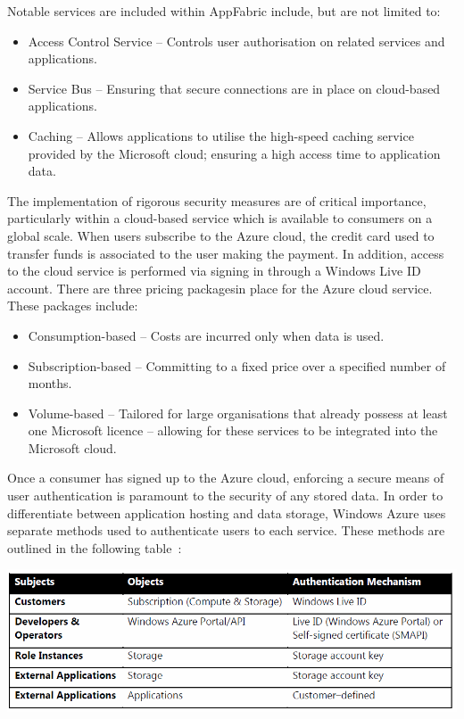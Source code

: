Notable services are included within AppFabric include, but are not limited to\ftAtwo:\ftAtwoText
\begin{itemize}
\item Access Control Service -- Controls user authorisation on related services and applications.
\item Service Bus -- Ensuring that secure connections are in place on cloud-based applications.
\item Caching -- Allows applications to utilise the high-speed caching service provided by the Microsoft cloud; ensuring a high access time to application data.
\end{itemize}

The implementation of rigorous security measures are of critical importance, particularly within a cloud-based service which is available to consumers on a global scale. When users subscribe to the Azure cloud, the credit card used to transfer funds is associated to the user making the payment. In addition, access to the cloud service is performed via signing in through a Windows Live ID account. 
There are three pricing packages\ftAthree in place for the Azure cloud service. These packages include:\ftAthreeText
\begin{itemize}
\item Consumption-based -- Costs are incurred only when data is used.
\item Subscription-based -- Committing to a fixed price over a specified number of months.
\item Volume-based -- Tailored for large organisations that already possess at least one Microsoft licence -- allowing for these services to be integrated into the Microsoft cloud. 
\end{itemize}

Once a consumer has signed up to the Azure cloud, enforcing a secure means of user authentication is paramount to the security of any stored data. In order to differentiate between application hosting and data storage, Windows Azure uses separate methods used to authenticate users to each service. These methods are outlined in the following table~\cite{AzureSecurity}:

\begin{center}
\includegraphics[scale=0.6]{figs/AzureTable.png} \\
\end{center}

